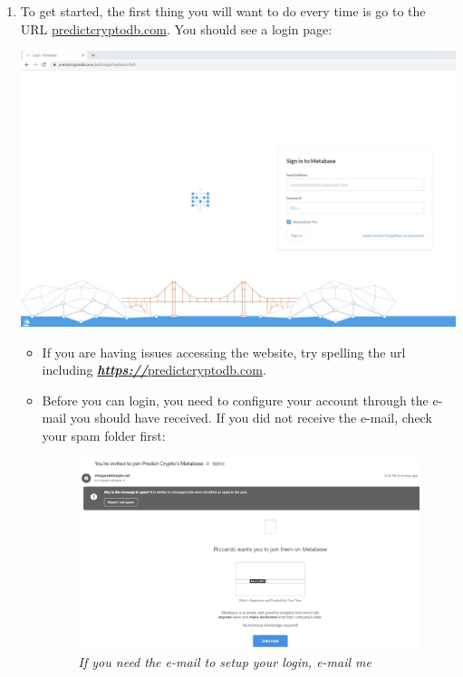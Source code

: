 \documentclass[]{book}
\begin{document}
\begin{enumerate}
\def\labelenumi{\arabic{enumi}.}
\item
  To get started, the first thing you will want to do every time is go to the URL \href{https://predictcryptodb.com}{predictcryptodb.com}. You should see a login page:

  \includegraphics{images/MetabaseLogin.jpg}

  \begin{itemize}
  \item
    If you are having issues accessing the website, try spelling the url including \href{https://predictcryptodb.com}{\textbf{\emph{https://}}predictcryptodb.com}.
  \item
    Before you can login, you need to configure your account through the e-mail you should have received. If you did not receive the e-mail, check your spam folder first:

    \begin{figure}
    \centering
    \includegraphics{images/MetabaseInvite.jpg}
    \caption{\emph{If you need the e-mail to setup your login, e-mail me}}
    \end{figure}


\end{itemize}
\end{enumerate}
\end{document}

